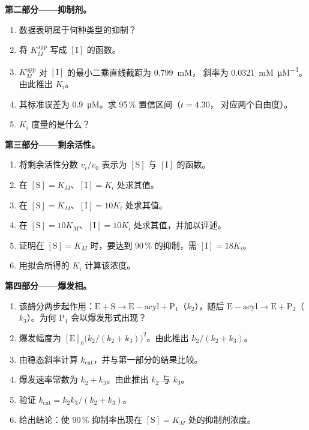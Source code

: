 \begin{problem}
\medskip\noindent\textbf{第二部分——抑制剂。}
\begin{enumerate}[resume]
  \item 数据表明属于何种类型的抑制？
  \item 将 $K_M^{\mathrm{app}}$ 写成 $[\mathrm I]$ 的函数。
  \item $K_M^{\mathrm{app}}$ 对 $[\mathrm I]$ 的最小二乘直线截距为 \qty{0.799}{mM}，
        斜率为 \qty{0.0321}{mM.\micro M^{-1}}。由此推出 $K_i$。
  \item 其标准误差为 \qty{0.9}{\micro M}。求 95\,\% 置信区间（$t = 4.30$，
        对应两个自由度）。
  \item $K_i$ 度量的是什么？
\end{enumerate}

\medskip\noindent\textbf{第三部分——剩余活性。}
\begin{enumerate}[resume]
  \item 将剩余活性分数 $v_i/v_0$ 表示为 $[\mathrm S]$ 与 
        $[\mathrm I]$ 的函数。
  \item 在 $[\mathrm S] = K_M$、$[\mathrm I] = K_i$ 处求其值。
  \item 在 $[\mathrm S] = K_M$、$[\mathrm I] = 10K_i$ 处求其值。
  \item 在 $[\mathrm S] = 10K_M$、$[\mathrm I] = 10K_i$ 处求其值，并加以评述。
  \item 证明在 $[\mathrm S] = K_M$ 时，要达到 90\,\% 的抑制，需 $[\mathrm I] = 18K_i$。
  \item 用拟合所得的 $K_i$ 计算该浓度。
\end{enumerate}

\medskip\noindent\textbf{第四部分——爆发相。}
\begin{enumerate}[resume]
  \item 该酶分两步起作用：$\mathrm{E + S \to E{-}acyl + P_1}$（$k_2$），随后 $\mathrm{E{-}acyl \to E +
        P_2}$（$k_3$）。为何 $\mathrm P_1$ 会以爆发形式出现？
  \item 爆发幅度为 $[\mathrm E]_0\bigl(k_2/(k_2 + k_3)\bigr)^2$。由此推出 $k_2/(k_2 + k_3)$。
  \item 由稳态斜率计算 $k_{\mathrm{cat}}$，并与第一部分的结果比较。
  \item 爆发速率常数为 $k_2 + k_3$。由此推出 $k_2$ 与 $k_3$。
  \item 验证 $k_{\mathrm{cat}} = k_2k_3/(k_2 + k_3)$。
  \item 给出结论：使 90\,\% 抑制率出现在
        $[\mathrm S] = K_M$ 处的抑制剂浓度。
\end{enumerate}
\end{problem}
